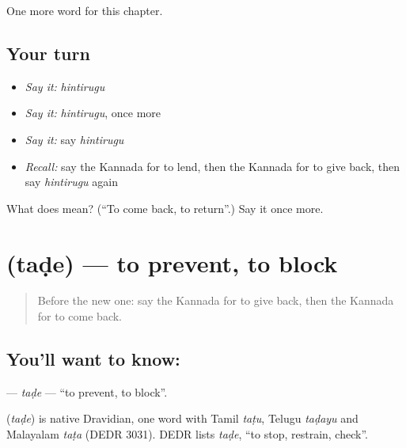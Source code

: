 \begin{grammarlens}[title={What you've built}]
One more word for this chapter.
\end{grammarlens}

\subsection*{Your turn}
\begin{itemize}
\raggedright
  \item \emph{Say it:} \emph{hintirugu}
  \item \emph{Say it:} \emph{hintirugu}, once more
  \item \emph{Say it:} say \emph{hintirugu}
  \item \emph{Recall:} say the Kannada for to lend, then the Kannada for to give back, then say \emph{hintirugu} again
\end{itemize}

\begin{tcolorbox}[breakable,colback=teal!4,colframe=teal!35!black,title={Before you move on}]
What does  mean? (\textquotedblleft{}To come back, to return\textquotedblright{}.) Say it once more.
\end{tcolorbox}
\section[\texorpdfstring{\kn{ತಡೆ} (taḍe)}{ತಡೆ (taḍe)}]{ (taḍe) — to prevent, to block}

\label{lesson:KA-C278-tade}



\begin{quote}
Before the new one: say the Kannada for to give back, then the Kannada for to come back.
\end{quote}

\subsection*{You'll want to know: }
\textbf{} — \emph{taḍe} — \textquotedblleft{}to prevent, to block\textquotedblright{}.

\begin{cousinweb}
\textbf{} (\emph{taḍe}) is native Dravidian, one word with Tamil \emph{taṭu}, Telugu \emph{taḍayu} and Malayalam \emph{taṭa} (DEDR 3031). DEDR lists \emph{taḍe}, \textquotedblleft{}to stop, restrain, check\textquotedblright{}.
\end{cousinweb}

